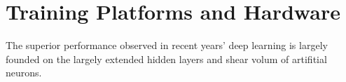 \section{Training Platforms and Hardware}
The superior performance observed in recent years' deep learning is largely founded on the largely extended hidden layers and shear volum of artifitial neurons. 